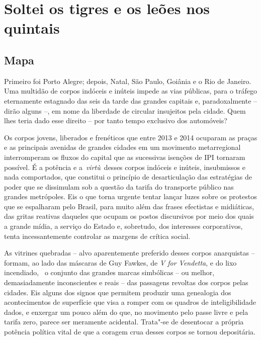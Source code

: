 \section{Soltei os tigres e os leões nos quintais}


\subsection{Mapa}

Primeiro foi Porto Alegre; depois, Natal, São
Paulo, Goiânia e o Rio de Janeiro. Uma multidão de corpos indóceis e
inúteis impede as vias públicas, para o tráfego eternamente estagnado
das seis da tarde das grandes capitais e, paradoxalmente -- dirão alguns
--, em nome da liberdade de circular insujeitos pela cidade. Quem lhes
teria dado esse direito -- por tanto tempo exclusivo dos automóveis?

Os corpos jovens, liberados e frenéticos que entre 2013 e 2014 ocuparam
as praças e as principais avenidas de grandes cidades em um movimento
metarregional interromperam os fluxos do capital que as sucessivas
isenções de IPI tornaram possível. É a potência e a~\emph{virtù~}desses
corpos indóceis e inúteis, insubmissos e nada comportados, que constitui
o princípio de desarticulação das estratégias de poder que se dissimulam
sob a questão da tarifa do transporte público nas grandes metrópoles.
Eis o que torna urgente tentar lançar luzes sobre os protestos que se
espalharam pelo Brasil, para muito além das frases efectistas e
midiáticas, das gritas reativas daqueles que ocupam os postos
discursivos por meio dos quais a grande mídia, a serviço do Estado e,
sobretudo, dos interesses corporativos, tenta incessantemente controlar
as margens de crítica social.

As vitrines quebradas -- alvo aparentemente preferido desses corpos
anarquistas -- formam, ao lado das máscaras de Guy Fawkes, de \emph{V
for Vendetta}, e do lixo incendiado,~ o conjunto das grandes marcas
simbólicas -- ou melhor, demasiadamente inconscientes e reais -- das
passagens revoltas dos corpos pelas cidades. Eis alguns dos signos que
permitem produzir uma genealogia dos acontecimentos de superfície que
visa a romper com os quadros de inteligibilidade dados, e enxergar um
pouco além do que, no movimento pelo passe livre e pela tarifa zero,
parece ser meramente acidental. Trata"-se de desentocar a própria
potência política vital de que a coragem crua desses corpos se tornou
depositária.

